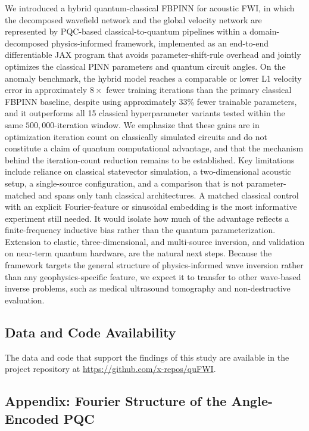 We introduced a hybrid quantum-classical FBPINN for acoustic FWI, in which the decomposed wavefield network and the global velocity network are represented by PQC-based classical-to-quantum pipelines within a domain-decomposed physics-informed framework, implemented as an end-to-end differentiable JAX program that avoids parameter-shift-rule overhead and jointly optimizes the classical PINN parameters and quantum circuit angles. On the anomaly benchmark, the hybrid model reaches a comparable or lower L1 velocity error in approximately $8\times$ fewer training iterations than the primary classical FBPINN baseline, despite using approximately $33$\% fewer trainable parameters, and it outperforms all 15 classical hyperparameter variants tested within the same $500{,}000$-iteration window. We emphasize that these gains are in optimization iteration count on classically simulated circuits and do not constitute a claim of quantum computational advantage, and that the mechanism behind the iteration-count reduction remains to be established. Key limitations include reliance on classical statevector simulation, a two-dimensional acoustic setup, a single-source configuration, and a comparison that is not parameter-matched and spans only tanh classical architectures. A matched classical control with an explicit Fourier-feature or sinusoidal embedding is the most informative experiment still needed. It would isolate how much of the advantage reflects a finite-frequency inductive bias rather than the quantum parameterization. Extension to elastic, three-dimensional, and multi-source inversion, and validation on near-term quantum hardware, are the natural next steps. Because the framework targets the general structure of physics-informed wave inversion rather than any geophysics-specific feature, we expect it to transfer to other wave-based inverse problems, such as medical ultrasound tomography and non-destructive evaluation.

\subsection{Data and Code Availability}

The data and code that support the findings of this study are available in the project repository at \url{https://github.com/x-repos/quFWI}.

\subsection{Appendix: Fourier Structure of the Angle-Encoded PQC}\label{app:ch4-fourier}


